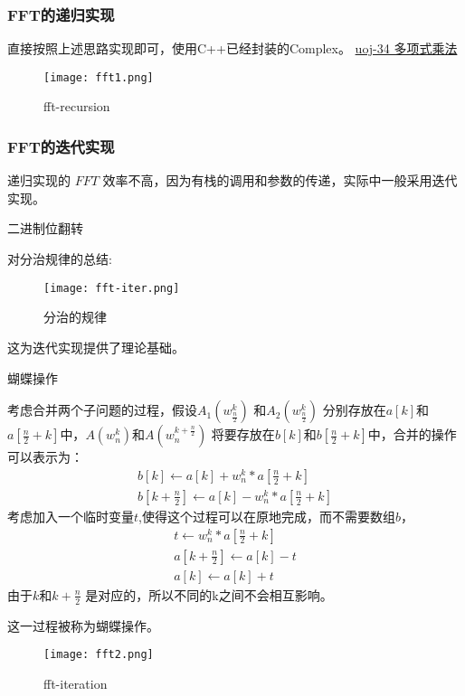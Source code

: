 \subsubsection{FFT的递归实现}
直接按照上述思路实现即可，使用C++已经封装的Complex。
\href{http://uoj.ac/problem/34}{uoj-34 多项式乘法}

\begin{figure}[!htbp]
	\centering
	\texttt{[image: fft1.png]}
	\caption{fft-recursion \label{fig:fft1}}
\end{figure}




\subsubsection{FFT的迭代实现}
递归实现的 $FFT$ 效率不高，因为有栈的调用和参数的传递，实际中一般采用迭代实现。

{\heiti 二进制位翻转}

对分治规律的总结:
\begin{figure}[!htbp]
	\centering
	\texttt{[image: fft-iter.png]}
	\caption{分治的规律 \label{fig:fft-pattern}}
\end{figure}
这为迭代实现提供了理论基础。

{\heiti 蝴蝶操作}

考虑合并两个子问题的过程，假设$A_1(w_{\frac{n}{2}}^k)$ 和$A_2(w_{\frac{n}{2}}^k)$ 分别存放在$a[k]$和$a[\frac{n}{2}+k]$中，$A(w_n^k)$和$A(w_n^{k+\frac{n}{2}})$ 将要存放在$b[k]$和$b[\frac{n}{2}+k]$中，合并的操作可以表示为：
\begin{align*}
b[k]\leftarrow  a[k]+w_n^k*a[\frac{n}{2}+k]  \\
b[k+\frac{n}{2}] \leftarrow a[k]-w_n^k*a[\frac{n}{2}+k]
\end{align*}
考虑加入一个临时变量$t$,使得这个过程可以在原地完成，而不需要数组$b$，	
\begin{align*}
t \leftarrow w_n^k*a[\frac{n}{2}+k]   \\
a[k+\frac{n}{2}] \leftarrow a[k]-t  \\
a[k] \leftarrow a[k]+t
\end{align*}
由于$k$和$k+\frac{n}{2}$ 是对应的，所以不同的k之间不会相互影响。

这一过程被称为蝴蝶操作。

\begin{figure}[!htbp]
	\centering
	\texttt{[image: fft2.png]}
	\caption{fft-iteration \label{fig:fft2}}
\end{figure}

